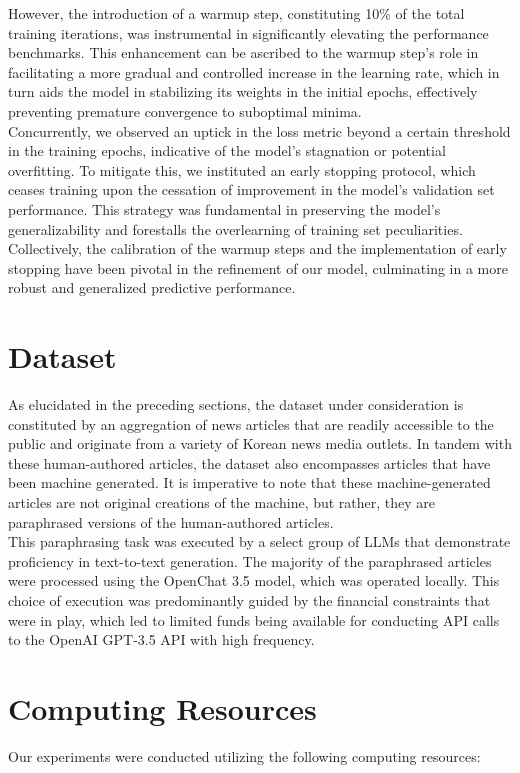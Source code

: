 \documentclass{article}
\begin{document}
However, the introduction of a warmup step, constituting 10\% of the total training iterations, was instrumental in significantly elevating the performance benchmarks.
This enhancement can be ascribed to the warmup step's role in facilitating a more gradual and controlled increase in the learning rate,
which in turn aids the model in stabilizing its weights in the initial epochs, effectively preventing premature convergence to suboptimal minima. \\
\null\quad Concurrently, we observed an uptick in the loss metric beyond a certain threshold in the training epochs, indicative of the model's stagnation or potential overfitting.
To mitigate this, we instituted an early stopping protocol, which ceases training upon the cessation of improvement in the model's validation set performance.
This strategy was fundamental in preserving the model's generalizability and forestalls the overlearning of training set peculiarities.
Collectively, the calibration of the warmup steps and the implementation of early stopping have been pivotal in the refinement of our model, culminating in a more robust and generalized predictive performance.

\section{Dataset}
\null\quad As elucidated in the preceding sections, the dataset under consideration is constituted by an aggregation of news articles that are readily accessible to the public and originate from a variety of Korean news media outlets.
In tandem with these human-authored articles, the dataset also encompasses articles that have been machine generated.
It is imperative to note that these machine-generated articles are not original creations of the machine, but rather, they are paraphrased versions of the human-authored articles. \\
\null\quad This paraphrasing task was executed by a select group of LLMs that demonstrate proficiency in text-to-text generation.
The majority of the paraphrased articles were processed using the OpenChat 3.5 model, which was operated locally.
This choice of execution was predominantly guided by the financial constraints that were in play, which led to limited funds being available for conducting API calls to the OpenAI GPT-3.5 API with high frequency.

\section{Computing Resources}
Our experiments were conducted utilizing the following computing resources:
\end{document}
